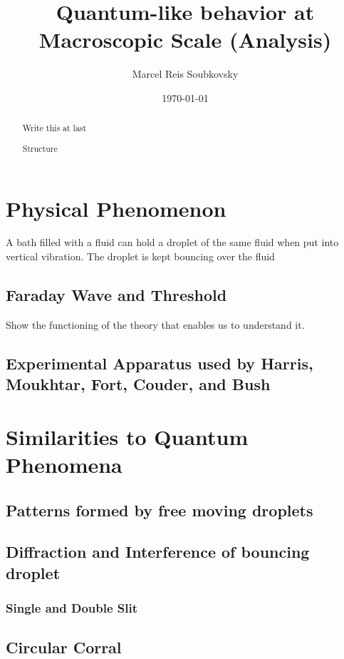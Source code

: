 \documentclass[%
 reprint,
 amsmath,amssymb,
 aps,
]{revtex4-1}
\begin{document}

\title{Quantum-like behavior at Macroscopic Scale (Analysis)}%

\author{Marcel Reis Soubkovsky}
%

\date{\today}%

\begin{abstract}
Write this at last
\begin{description}
\item[Structure]
\end{description}
\end{abstract}

\maketitle


\section{Physical Phenomenon}
A bath filled with a fluid can hold a droplet of the same fluid when put into vertical vibration.\cite{couder_bouncing_2005} The droplet is kept bouncing over the fluid 

    \subsection{Faraday Wave and Threshold}
        Show the functioning of the theory that enables us to understand it.
    \subsection{Experimental Apparatus used by Harris, Moukhtar, Fort, Couder, and Bush}


\section{Similarities to Quantum Phenomena}

    \subsection{Patterns formed by free moving droplets}
    \subsection{Diffraction and Interference of bouncing droplet}
        \subsubsection{Single and Double Slit}
    \subsection{Circular Corral}
    
    
    
    
    
\end{document}
